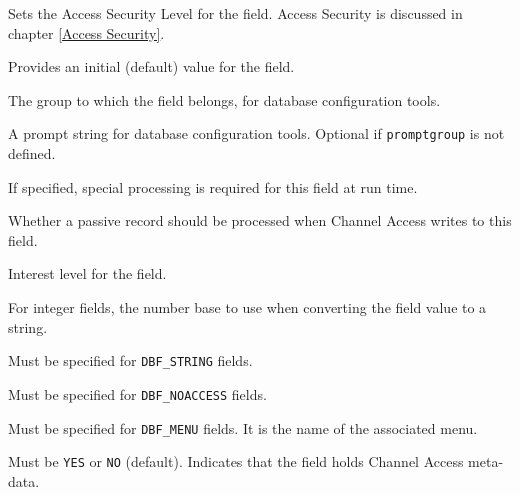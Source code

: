 \begin{description}

\item [asl] Sets the Access Security Level for the field.
Access Security is discussed in chapter \ref{Access Security}.

\item [initial] Provides an initial (default) value for the field.

\item [promptgroup] The group to which the field belongs, for database configuration tools.

\item [prompt] A prompt string for database configuration tools.
Optional if \verb|promptgroup| is not defined.

\item [special] If specified, special processing is required for this field at run time.

\item [pp] Whether a passive record should be processed when Channel Access writes to this field.

\item [interest] Interest level for the field.

\item [base] For integer fields, the number base to use when converting the field value to a string.

\item [size] Must be specified for \verb|DBF_STRING| fields.

\item [extra] Must be specified for \verb|DBF_NOACCESS| fields.

\item [menu] Must be specified for \verb|DBF_MENU| fields.
It is the name of the associated menu.

\item [prop] Must be \verb|YES| or \verb|NO| (default).
Indicates that the field holds Channel Access meta-data.
\end{description}

